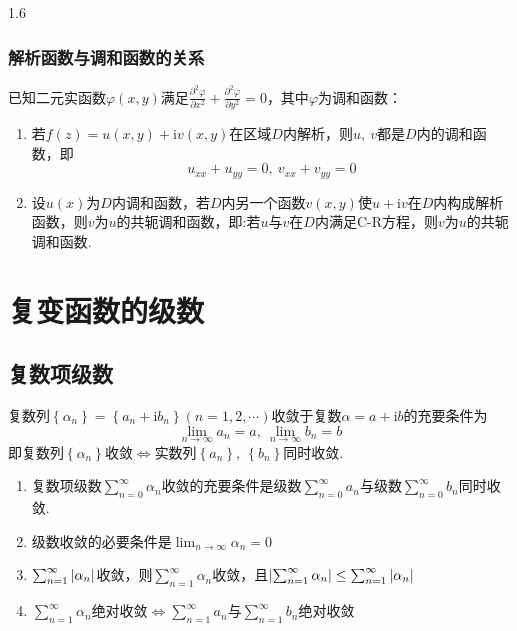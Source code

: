 \documentclass[lang=cn,10pt]{elegantbook}
\renewcommand{\i}{\mathrm{i}}
\begin{document}
\begin{spacing}{1.6}
\subsection{解析函数与调和函数的关系}
已知二元实函数$\varphi\left(x,y\right)$满足$\frac{\partial^2\varphi}{\partial x^2}+\frac{\partial^2\varphi}{\partial y^2}=0$，其中$\varphi$为调和函数：
\begin{theorem}
\begin{enumerate}
    \item 若$f\left(z\right)=u\left(x,y\right)+\i v\left(x,y\right)$在区域$D$内解析，则$u,\ v$都是$D$内的调和函数，即
    $$u_{xx}+u_{yy}=0,\ v_{xx}+v_{yy}=0$$
    \item 设$u\left(x\right)$为$D$内调和函数，若$D$内另一个函数$v\left(x,y\right)$使$u+\i v$在$D$内构成解析函数，则$v$为$u$的共轭调和函数，即:若$u$与$v$在$D$内满足C-R方程，则$v$为$u$的共轭调和函数.
\end{enumerate}
\end{theorem}
\chapter{复变函数的级数}
\section{复数项级数}
    \begin{theorem}
    复数列$\left\{\alpha_n\right\}=\left\{a_n+\i b_n\right\}(n=1,2,\cdots)$收敛于复数$\alpha=a+\i b$的充要条件为
    $$\lim_{n\to\infty}a_n=a,\ \lim_{n\to\infty}b_n=b$$
    即复数列$\left\{\alpha_n\right\}$收敛$\Longleftrightarrow$实数列$\left\{a_n\right\},\ \left\{b_n\right\}$同时收敛.
    \begin{enumerate}
        \item 复数项级数$\sum_{n=0}^{\infty}{\alpha_n}$收敛的充要条件是级数$\sum_{n=0}^{\infty}{a_n}$与级数$\sum_{n=0}^{\infty}{b_n}$同时收敛.
        \item 级数收敛的必要条件是$\lim_{n\to\infty}\alpha_n=0$
        \item $\sum_{n=1}^{\infty}{\abs{\alpha_n}}$收敛，则$\sum_{n=1}^{\infty}\alpha_n$收敛，且$\abs{\sum_{n=1}^{\infty}{\alpha_n}}\leq\sum_{n=1}^{\infty}{\abs{\alpha_n}}$
        \item $\sum_{n=1}^{\infty}{\alpha_n}$绝对收敛$\Longleftrightarrow\sum_{n=1}^{\infty}{a_n}$与$\sum_{n=1}^{\infty}{b_n}$绝对收敛
    \end{enumerate}
    \end{theorem}


\end{spacing}
\end{document}
